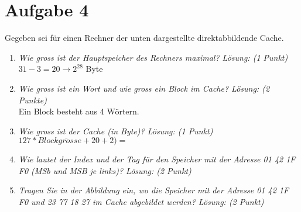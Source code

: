 \documentclass[10pt]{article}
\begin{document}
\newpage
\section*{Aufgabe 4}
Gegeben sei für einen Rechner der unten dargestellte direktabbildende Cache. 
\begin{enumerate}[label=\alph*)]
	\item
		\textit{Wie gross ist der Hauptspeicher des Rechners maximal? Lösung: (1 Punkt)} \\
		 $31 - 3 = 20 \rightarrow 2^28$ Byte
	\item
		\textit{Wie gross ist ein Wort und wie gross ein Block im Cache? Lösung: (2 Punkte)} \\
		Ein Block besteht aus 4 Wörtern.
	\item
		\textit{Wie gross ist der Cache (in Byte)? Lösung: (1 Punkt)} \\
		$127 * Blockgr\ddot{o}sse + 20 + 2) = $
	\item
		\textit{Wie lautet der Index und der Tag für den Speicher mit der Adresse 01 42 1F F0 (MSb und MSB je links)? Lösung: (2 Punkt)} \\
		
	\item
		\textit{Tragen Sie in der Abbildung ein, wo die Speicher mit der Adresse 01 42 1F F0 und 23 77 18 27 im Cache abgebildet werden? Lösung: (2 Punkt)} \\
\end{enumerate}
\end{document}
